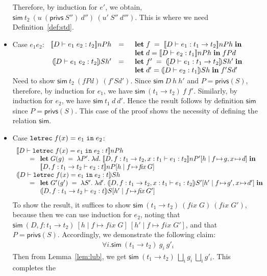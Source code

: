 \documentclass[submission,copyright,creativecommons]{eptcs}
\newcommand{\mletml}[3]{\MLET\;#1=#2\;\MIN\;#3}
\newcommand{\vmlet}[2]{\begin{array}[t]{l} \MLET\;{#1}\;\MIN\\
                            {#2}
                            \end{array}}
\newcommand{\IN}{\mbox{\texttt{in}}}
\newcommand{\MIN}{\mbox{\textbf{in}}}
\newcommand{\LET}{\mbox{\texttt{let}}}
\newcommand{\MLET}{\mbox{\textbf{let}}}
\newcommand{\REC}{{\texttt{rec}}}
\newcommand{\ldb}{[\![}
\newcommand{\rdb}{]\!]}
\newcommand{\means}[1]{\ldb {#1}\rdb}
\newcommand{\proves}{\vdash}
\newcommand{\ext}[3]{[#1\mid#2\!\mapsto\!#3]}
\newcommand{\recext}[5]{[#1\mid#2\!\mapsto\!#3,#4\!\mapsto\!#5]}
\newcommand{\lam}[2]{\lambda #1.\; #2} \newcommand{\all}[2]{\forall #1.\; #2}
\newcommand{\recdecl}[3]{\REC\;#1(#2) = #3}
\newcommand{\fix}{\textit{fix}}
\newcommand{\Lub}{\bigsqcup}
\newcommand{\privs}{\textsf{privs}}
\newcommand{\Sim}{\textsf{sim}}
\newcommand{\letdecl}[2]{\LET#1\;\IN\;#2}
\newcommand{\D}{D} \newcommand{\ty}{t} \renewcommand{\th}{\theta}
\newcommand{\n}{n} \newcommand{\p}{p} \newcommand{\Ps}{\Pi} \newcommand{\h}{h}
\newcommand{\meanss}[1]{(\![ {#1}]\!)}
\newenvironment{xproof}{\begin{trivlist}\item[\hskip\labelsep{\bf  
Proof:}]}{\end{trivlist}}
\begin{document}
\begin{xproof}
\begin{itemize}
Therefore, by induction for $e'$, we obtain, $\Sim~\ty_2~(u~(\privs~S'')~d'')~(u'~S''~d''')$. This is where we need Definition~\ref{def:std}.
\item Case $e_1e_2$:
\(\begin{array}[t]{rcl}
\means{\D\proves e_1\;e_2:\ty_2}\n P \h &=&
  \vmlet{f\;=\;\means{\D\proves e_1:\ty_1\to\ty_2}\n P \h}
        {\mletml{d}{\means{\D\proves e_2:\ty_1}\n P \h}{f P d}}\\
\meanss{\D\proves e_1\;e_2:\ty_2}S \h' &=&
  \vmlet{f'\;=\;\meanss{\D\proves e_1:\ty_1\to\ty_2}S \h'}
        {\mletml{d'}{\meanss{\D\proves e_2:\ty_1}S \h}{f' S d'}}
\end{array}\)\\
Need to show $\Sim~\ty_2~(f P d)~(f' S d')$. Since $\Sim~\D~\h~\h'$ and
$P=\privs(S)$, therefore, by induction for $e_1$, we have
$\Sim~(\ty_1\to\ty_2)~f~f'$. Similarly, by induction for $e_2$, we have
$\Sim~\ty_1~d~d'$. Hence the result follows by definition $\Sim$  
since $P=\privs(S)$. This case of the proof shows the necessity of defining
the relation $\Sim$.
\item Case $\letdecl{\recdecl{f}{x}{e_1}}{e_2}$:
\[
\begin{array}{lcl}
\multicolumn{3}{l}{
\means{\D\proves\letdecl{\recdecl{f}{x}{e_1}}{e_2}:\ty}\n P \h}\\
\multicolumn{3}{l}{
\qquad 
= \vmlet{G(g)\;=\;
\lam{P'}
    {\lam{d}
         {\means{\D,f:\ty_1\to\ty_2,x:\ty_1\proves e_1:\ty_2}\n P' 
          \recext{\h}{f}{g}{x}{d}}}}
{\means{\D,f:\ty_1\to\ty_2\proves e_2:\ty}\n P \ext{\h}{f}{\fix\;G}}
}\\
\multicolumn{3}{l}{
\meanss{\D\proves\letdecl{\recdecl{f}{x}{e_1}}{e_2}:\ty}S \h} \\
\multicolumn{3}{l}{
\qquad 
= \vmlet{G'(g')\;=\;
\lam{S'}
    {\lam{d'}
         {\meanss{\D,f:\ty_1\to\ty_2,x:\ty_1\proves e_1:\ty_2}S'
          \recext{\h'}{f}{g'}{x}{d'}}}}
{\meanss{\D,f:\ty_1\to\ty_2\proves e_2:\ty}S \ext{\h'}{f}{\fix\;G'}}} 
\end{array}
\]
To show the result, it suffices to show 
$\Sim~(\ty_1\to\ty_2)~(\fix\;G)~(\fix\;G')$, because then we can use induction
for $e_2$, noting that 
$\Sim~(\D,f:\ty_1\to\ty_2)~\ext{\h}{f}{\fix\;G}~\ext{\h'}{f}{\fix\;G'}$,
and that $P=\privs(S)$.
Accordingly, we demonstrate the following claim:
\begin{eqnarray}
\label{sim:1}
& \forall i.\Sim~(\ty_1\to\ty_2)~g_i~g'_i 
\end{eqnarray}
Then from Lemma~\ref{lem:lub}, we get 
$\Sim~(\ty_1\to\ty_2)~\Lub_{i}g_i~\Lub_{i}g'_i$. This completes the

\end{itemize}
\end{xproof}
\end{document}
